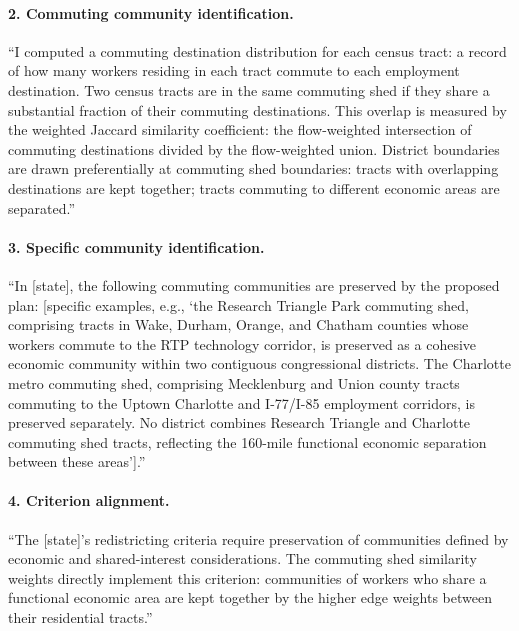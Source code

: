 \paragraph{2. Commuting community identification.}
``I computed a commuting destination distribution for each census tract:
a record of how many workers residing in each tract commute to each
employment destination.
Two census tracts are in the same commuting shed if they share a substantial
fraction of their commuting destinations.
This overlap is measured by the weighted Jaccard similarity coefficient:
the flow-weighted intersection of commuting destinations divided by the
flow-weighted union.
District boundaries are drawn preferentially at commuting shed boundaries:
tracts with overlapping destinations are kept together; tracts commuting
to different economic areas are separated.''

\paragraph{3. Specific community identification.}
``In [state], the following commuting communities are preserved by the
proposed plan: [specific examples, e.g., `the Research Triangle Park
commuting shed, comprising tracts in Wake, Durham, Orange, and Chatham
counties whose workers commute to the RTP technology corridor, is preserved
as a cohesive economic community within two contiguous congressional districts.
The Charlotte metro commuting shed, comprising Mecklenburg and Union county
tracts commuting to the Uptown Charlotte and I-77/I-85 employment corridors,
is preserved separately.
No district combines Research Triangle and Charlotte commuting shed tracts,
reflecting the 160-mile functional economic separation between these areas'].''

\paragraph{4. Criterion alignment.}
``The [state]'s redistricting criteria require preservation of communities
defined by economic and shared-interest considerations.
The commuting shed similarity weights directly implement this criterion:
communities of workers who share a functional economic area are kept
together by the higher edge weights between their residential tracts.''
